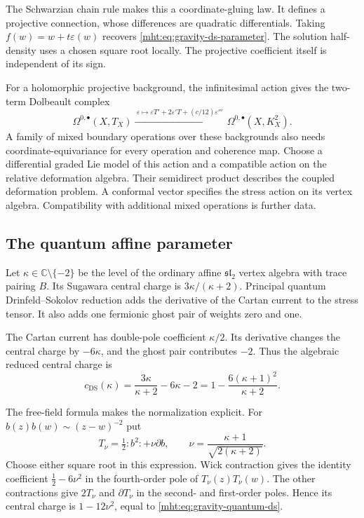 The Schwarzian chain rule makes this a coordinate-gluing law.
It defines a projective connection, whose differences are
quadratic differentials.
Taking $f(w)=w+t\varepsilon(w)$ recovers
\eqref{mht:eq:gravity-ds-parameter}.
The solution half-density uses a chosen square root locally.
The projective coefficient itself is independent of its sign.

For a holomorphic projective background, the infinitesimal action
gives the two-term Dolbeault complex
\[
 \Omega^{0,\bullet}(X,T_X)
 \xrightarrow{\ \varepsilon\mapsto
       \varepsilon T'+2\varepsilon'T+(c/12)\varepsilon'''\ }
 \Omega^{0,\bullet}(X,K_X^2).
\]
A family of mixed boundary operations over these backgrounds also
needs coordinate-equivariance for every operation and coherence map.
Choose a differential graded Lie model of this action and a
compatible action on the relative deformation algebra.
Their semidirect product describes the coupled deformation problem.
A conformal vector specifies the stress action on its vertex algebra.
Compatibility with additional mixed operations is further data.

\subsection{The quantum affine parameter}

Let $\kappa\in\mathbb C\setminus\{-2\}$ be the level of the ordinary affine
$\mathfrak{sl}_2$ vertex algebra with trace pairing $B$.
Its Sugawara central charge is $3\kappa/(\kappa+2)$.
Principal quantum Drinfeld--Sokolov reduction adds the derivative
of the Cartan current to the stress tensor.
It also adds one fermionic ghost pair of weights zero and one.

The Cartan current has double-pole coefficient $\kappa/2$.
Its derivative changes the central charge by $-6\kappa$, and
the ghost pair contributes $-2$.
Thus the algebraic reduced central charge is
\begin{equation}\label{mht:eq:gravity-quantum-ds}
 c_{\mathrm{DS}}(\kappa)
 =\frac{3\kappa}{\kappa+2}-6\kappa-2
 =1-\frac{6(\kappa+1)^2}{\kappa+2}.
\end{equation}

The free-field formula makes the normalization explicit.
For $b(z)b(w)\sim(z-w)^{-2}$ put
\[
 T_\nu=\tfrac12:b^2:+\nu\partial b,
 \qquad \nu=\frac{\kappa+1}{\sqrt{2(\kappa+2)}}.
\]
Choose either square root in this expression.
Wick contraction gives the identity coefficient
$\frac12-6\nu^2$ in the fourth-order pole of $T_\nu(z)T_\nu(w)$.
The other contractions give $2T_\nu$ and $\partial T_\nu$ in
the second- and first-order poles.
Hence its central charge is $1-12\nu^2$, equal to
\eqref{mht:eq:gravity-quantum-ds}.


